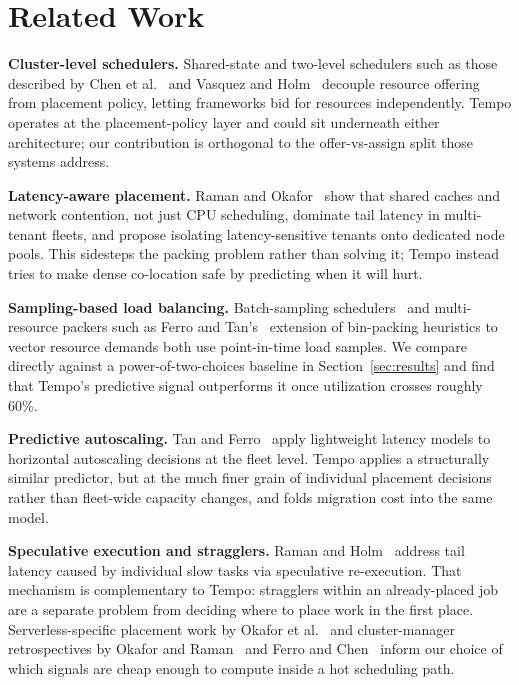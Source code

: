 \section{Related Work}
\label{sec:related}

\textbf{Cluster-level schedulers.} Shared-state and two-level schedulers
such as those described by Chen et al.~\cite{chen2015omega} and Vasquez and
Holm~\cite{vasquez2016mesoslike} decouple resource offering from placement
policy, letting frameworks bid for resources independently. Tempo operates
at the placement-policy layer and could sit underneath either architecture;
our contribution is orthogonal to the offer-vs-assign split those systems
address.

\textbf{Latency-aware placement.} Raman and Okafor~\cite{raman2020tail}
show that shared caches and network contention, not just CPU scheduling,
dominate tail latency in multi-tenant fleets, and propose isolating
latency-sensitive tenants onto dedicated node pools. This sidesteps the
packing problem rather than solving it; Tempo instead tries to make dense
co-location safe by predicting when it will hurt.

\textbf{Sampling-based load balancing.} Batch-sampling
schedulers~\cite{holm2018batch} and multi-resource packers such as
Ferro and Tan's~\cite{ferro2019tetris} extension of bin-packing heuristics
to vector resource demands both use point-in-time load samples. We compare
directly against a power-of-two-choices baseline in
Section~\ref{sec:results} and find that Tempo's predictive signal
outperforms it once utilization crosses roughly 60\%.

\textbf{Predictive autoscaling.} Tan and Ferro~\cite{tan2022predictive}
apply lightweight latency models to horizontal autoscaling decisions at
the fleet level. Tempo applies a structurally similar predictor, but at
the much finer grain of individual placement decisions rather than
fleet-wide capacity changes, and folds migration cost into the same model.

\textbf{Speculative execution and stragglers.} Raman and
Holm~\cite{raman2023straggler} address tail latency caused by individual
slow tasks via speculative re-execution. That mechanism is complementary
to Tempo: stragglers within an already-placed job are a separate problem
from deciding where to place work in the first place. Serverless-specific
placement work by Okafor et al.~\cite{okafor2020serverless} and
cluster-manager retrospectives by Okafor and Raman~\cite{okafor2017borgish}
and Ferro and Chen~\cite{ferro2021elastic} inform our choice of which
signals are cheap enough to compute inside a hot scheduling path.
